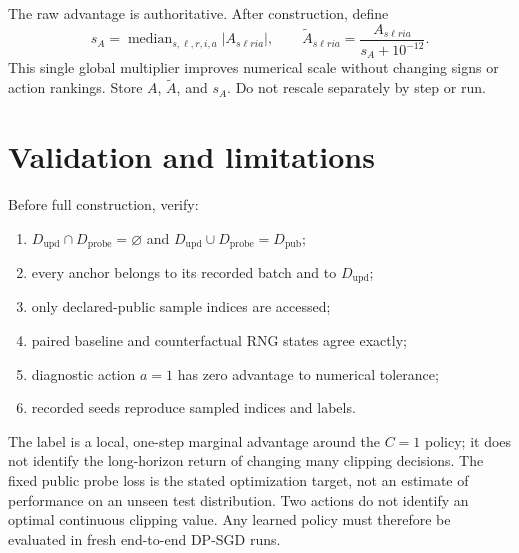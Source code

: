 \documentclass[10pt]{article}
\newcommand{\Dpub}{D_{\mathrm{pub}}}
\newcommand{\Dupd}{D_{\mathrm{upd}}}
\newcommand{\Dprobe}{D_{\mathrm{probe}}}
\begin{document}
The raw advantage is authoritative. After construction, define
\[
  s_A=\operatorname{median}_{s,\ell,r,i,a}|A_{s\ell ria}|,
  \qquad
  \widetilde A_{s\ell ria}
  =\frac{A_{s\ell ria}}{s_A+10^{-12}}.
\]
This single global multiplier improves numerical scale without changing signs
or action rankings. Store $A$, $\widetilde A$, and $s_A$. Do not rescale
separately by step or run.

\section{Validation and limitations}

Before full construction, verify:
\begin{enumerate}[leftmargin=*,nosep]
  \item $\Dupd\cap\Dprobe=\varnothing$ and
        $\Dupd\cup\Dprobe=\Dpub$;
  \item every anchor belongs to its recorded batch and to $\Dupd$;
  \item only declared-public sample indices are accessed;
  \item paired baseline and counterfactual RNG states agree exactly;
  \item diagnostic action $a=1$ has zero advantage to numerical tolerance;
  \item recorded seeds reproduce sampled indices and labels.
\end{enumerate}

The label is a local, one-step marginal advantage around the $C=1$ policy; it
does not identify the long-horizon return of changing many clipping decisions.
The fixed public probe loss is the stated optimization target, not an estimate
of performance on an unseen test distribution. Two actions do not identify an
optimal continuous clipping value. Any learned policy must therefore be
evaluated in fresh end-to-end DP-SGD runs.
\end{document}

